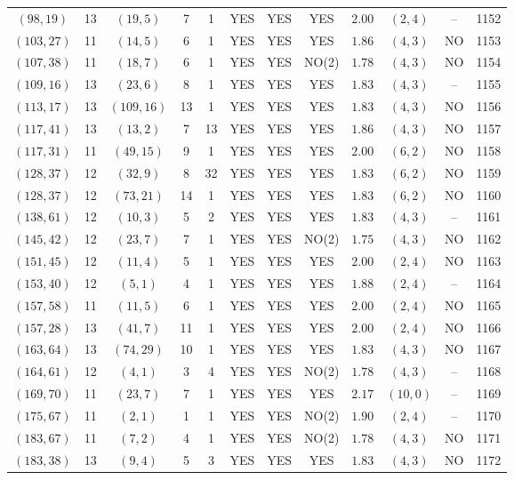 \begin{longtable}{|c|c|c|c|c|c|c|c|c|c|c|c|}
$(98,19)$ & 13 & $(19,5)$ & 7 & 1 & YES & YES & YES & $2.00$ & $(2,4)$ & -- & 1152\\
$(103,27)$ & 11 & $(14,5)$ & 6 & 1 & YES & YES & YES & $1.86$ & $(4,3)$ & NO & 1153\\
$(107,38)$ & 11 & $(18,7)$ & 6 & 1 & YES & YES & NO(2) & $1.78$ & $(4,3)$ & NO & 1154\\
$(109,16)$ & 13 & $(23,6)$ & 8 & 1 & YES & YES & YES & $1.83$ & $(4,3)$ & -- & 1155\\
$(113,17)$ & 13 & $(109,16)$ & 13 & 1 & YES & YES & YES & $1.83$ & $(4,3)$ & NO & 1156\\
$(117,41)$ & 13 & $(13,2)$ & 7 & 13 & YES & YES & YES & $1.86$ & $(4,3)$ & NO & 1157\\
$(117,31)$ & 11 & $(49,15)$ & 9 & 1 & YES & YES & YES & $2.00$ & $(6,2)$ & NO & 1158\\
$(128,37)$ & 12 & $(32,9)$ & 8 & 32 & YES & YES & YES & $1.83$ & $(6,2)$ & NO & 1159\\
$(128,37)$ & 12 & $(73,21)$ & 14 & 1 & YES & YES & YES & $1.83$ & $(6,2)$ & NO & 1160\\
$(138,61)$ & 12 & $(10,3)$ & 5 & 2 & YES & YES & YES & $1.83$ & $(4,3)$ & -- & 1161\\
$(145,42)$ & 12 & $(23,7)$ & 7 & 1 & YES & YES & NO(2) & $1.75$ & $(4,3)$ & NO & 1162\\
$(151,45)$ & 12 & $(11,4)$ & 5 & 1 & YES & YES & YES & $2.00$ & $(2,4)$ & NO & 1163\\
$(153,40)$ & 12 & $(5,1)$ & 4 & 1 & YES & YES & YES & $1.88$ & $(2,4)$ & -- & 1164\\
$(157,58)$ & 11 & $(11,5)$ & 6 & 1 & YES & YES & YES & $2.00$ & $(2,4)$ & NO & 1165\\
$(157,28)$ & 13 & $(41,7)$ & 11 & 1 & YES & YES & YES & $2.00$ & $(2,4)$ & NO & 1166\\
$(163,64)$ & 13 & $(74,29)$ & 10 & 1 & YES & YES & YES & $1.83$ & $(4,3)$ & NO & 1167\\
$(164,61)$ & 12 & $(4,1)$ & 3 & 4 & YES & YES & NO(2) & $1.78$ & $(4,3)$ & -- & 1168\\
$(169,70)$ & 11 & $(23,7)$ & 7 & 1 & YES & YES & YES & $2.17$ & $(10,0)$ & -- & 1169\\
$(175,67)$ & 11 & $(2,1)$ & 1 & 1 & YES & YES & NO(2) & $1.90$ & $(2,4)$ & -- & 1170\\
$(183,67)$ & 11 & $(7,2)$ & 4 & 1 & YES & YES & NO(2) & $1.78$ & $(4,3)$ & NO & 1171\\
$(183,38)$ & 13 & $(9,4)$ & 5 & 3 & YES & YES & YES & $1.83$ & $(4,3)$ & NO & 1172\\

\end{longtable}
